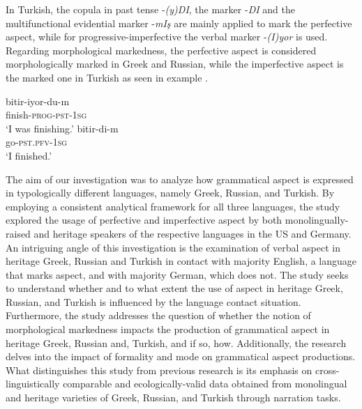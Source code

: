 \documentclass[output=paper,colorlinks,citecolor=brown]{langscibook}
\begin{document}
In Turkish, the copula in past tense -\textit{(y)DI}, the marker -\textit{DI} and the multifunctional evidential marker -\textit{mIş} are mainly applied to mark the perfective aspect, while for progressive-imperfective the verbal marker -\textit{(I)yor} is used. Regarding morphological markedness, the perfective aspect is considered morphologically marked in Greek and Russian, while the imperfective aspect is the marked one in Turkish as seen in example .

 \eal \label{TurkishAspectExample}
\ex \gll bitir-iyor-du-m\\
finish-\textsc{prog-pst-1sg}\\
\glt `I was finishing.'
\ex \gll bitir-di-m\\
go-\textsc{pst.pfv-1sg}\\
\glt `I finished.'
\zl

The aim of our investigation was to analyze how grammatical aspect is expressed in typologically different languages, namely Greek, Russian, and Turkish. By employing a consistent analytical framework for all three languages, the study explored the usage of perfective and imperfective aspect by both monolingually\hyp raised and heritage speakers of the respective languages in the US and Germany. An intriguing angle of this investigation is the examination of verbal aspect in heritage Greek, Russian and Turkish in contact with majority English, a language that marks aspect, and with majority German, which does not. The study seeks to understand whether and to what extent the use of aspect in heritage Greek, Russian, and Turkish is influenced by the language contact situation. Furthermore, the study addresses the question of whether the notion of morphological markedness impacts the production of grammatical aspect in heritage Greek, Russian and, Turkish, and if so, how. Additionally, the research delves into the impact of formality and mode on grammatical aspect productions. What distinguishes this study from previous research is its emphasis on cross-linguistically comparable and ecologically-valid data obtained from monolingual and heritage varieties of Greek, Russian, and Turkish through narration tasks.
\end{document}
